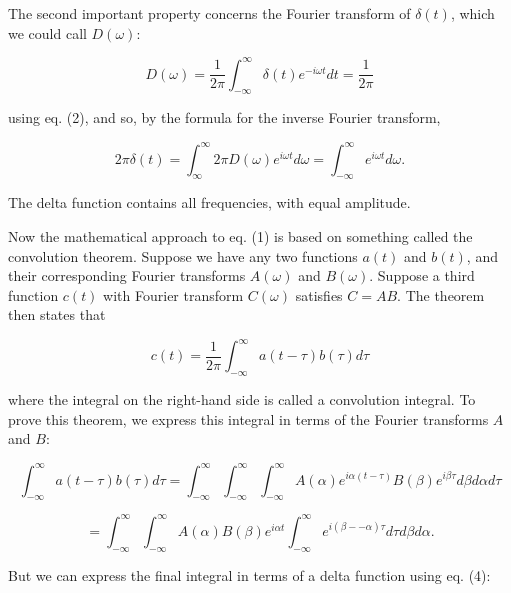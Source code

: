   The second important property concerns the Fourier transform of $\delta(t)$, 
  which we could call $D(\omega)$: 

  \begin{equation*}D(\omega)=\dfrac{1}{2 \pi} \int_{-\infty}^{\infty}{\delta(t) 
  e^{-i \omega t} dt} =\dfrac{1}{2 \pi} \tag{3}\end{equation*} 

  \noindent{}using eq. (2), and so, by the formula for the inverse Fourier 
  transform, 

  \begin{equation*}2 \pi \delta(t)=\int_{\infty}^{\infty}{2 \pi D(\omega) e^{i 
  \omega t} d \omega} =\int_{-\infty}^{\infty}{e^{i \omega t} d \omega} . 
  \tag{4}\end{equation*} 

  The delta function contains all frequencies, with equal amplitude. 

  Now the mathematical approach to eq. (1) is based on something called the 
  convolution theorem. Suppose we have any two functions $a(t)$ and $b(t)$, and 
  their corresponding Fourier transforms $A(\omega)$ and $B(\omega)$. Suppose a 
  third function $c(t)$ with Fourier transform $C(\omega)$ satisfies $C=AB$. 
  The theorem then states that 

  \begin{equation*}c(t)= \dfrac{1}{2 \pi} \int_{-\infty}^{\infty}{a(t-\tau) 
  b(\tau) d \tau} \tag{5}\end{equation*} 

  \noindent{}where the integral on the right-hand side is called a convolution 
  integral. To prove this theorem, we express this integral in terms of the 
  Fourier transforms $A$ and $B$: 

  \begin{equation*}\int_{-\infty}^{\infty}{a(t-\tau) b(\tau) d 
  \tau}=\int_{-\infty}^{\infty}{\int_{-\infty}^{\infty}{\int_{-\infty}^{\infty}{A(\alpha) 
  e^{i \alpha (t-\tau)} B(\beta) e^{i \beta \tau} d \beta} d \alpha } d 
  \tau}\end{equation*} 

  \begin{equation*}=\int_{-\infty}^{\infty}{\int_{-\infty}^{\infty}{A(\alpha) 
  B(\beta) e^{i \alpha t} \int_{-\infty}^{\infty}{e^{i (\beta -- \alpha) \tau} 
  d \tau} d \beta} d \alpha }. \tag{6}\end{equation*} 

  But we can express the final integral in terms of a delta function using eq. 
  (4): 

